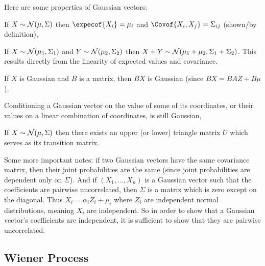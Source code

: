 Here are some properties of Gaussian vectors:
\benum
    \item If $X\sim{\cal N}(\mu,\Sigma)$ then $\expecof{X_i}=\mu_i$ and $\Covof{X_i,X_j}=\Sigma_{ij}$ (shown/by definition),
    \item If $X\sim{\cal N}(\mu_1,\Sigma_1)$ and $Y\sim{\cal N}(\mu_2,\Sigma_2)$ then $X+Y\sim{\cal N}(\mu_1+\mu_2,\Sigma_1+\Sigma_2)$.
        This results directly from the linearity of expected values and covariance.
    \item If $X$ is Gaussian and $B$ is a matrix, then $BX$ is Gaussian (since $BX=BAZ+B\mu$),
    \item Conditioning a Gaussian vector on the value of some of its coordinates, or their values on a linear combination of coordinates, is still Gaussian,
    \item If $X\sim{\cal N}(\mu,\Sigma)$ then there exists an upper (or lower) triangle matrix $U$ which serves as its transition matrix.
\eenum

Some more important notes: if two Gaussian vectors have the same covariance matrix, then their joint probabilities are the same (since joint probabilities are dependent only on $\Sigma$).
And if $(X_1,\dots,X_n)$ is a Gaussian vector such that the coefficients are pairwise uncorrelated, then $\Sigma$ is a matrix which is zero except on the diagonal.
Thus $X_i=\alpha_iZ_i+\mu_i$ where $Z_i$ are independent normal distributions, meaning $X_i$ are independent.
So in order to show that a Gaussian vector's coefficients are independent, it is sufficient to show that they are pairwise uncorrelated.

\subsection{Wiener Process}

